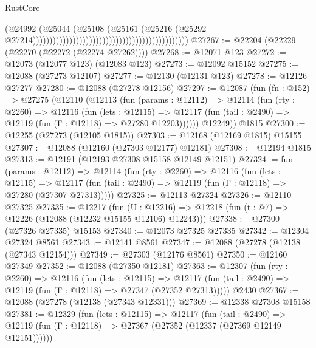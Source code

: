 \begin{lexlean}{RustCore}
\begin{coremodule}
                                                                                      (@24992
                                                                                        (@25044
                                                                                          (@25108
                                                                                            (@25161
                                                                                              (@25216
                                                                                                (@25292
                                                                                                  @27214)))))))))))))))))))))))))))))))))))))))))))))))
@27267 := @22204 (@22229 (@22270 (@22272 (@22274 @27262))))
@27268 := @12071 @123
@27272 := @12073 (@12077 @123) (@12083 @123)
@27273 := @12092 @15152
@27275 := @12088 (@27273 @12107)
@27277 := @12130 (@12131 @123)
@27278 := @12126 @27277
@27280 := @12088 (@27278 @12156)
@27297 := @12087
    (fun (fn : @152) =>
    @27275
      (@12110
        (@12113
          (fun (params : @12112) =>
          @12114
            (fun (rty : @2260) =>
            @12116
              (fun (lets : @12115) =>
              @12117 (fun (tail : @2490) => @12119 (fun (Γ : @12118) => @27280 @12203))))))
        @12249))
    @1815
@27300 := @12255 (@27273 (@12105 @1815))
@27303 := @12168 (@12169 @1815) @15155
@27307 := @12088 (@12160 (@27303 @12177) @12181)
@27308 := @12194 @1815
@27313 := @12191 (@12193 @27308 @15158 @12149 @12151)
@27324 := fun (params : @12112) =>
  @12114
    (fun (rty : @2260) =>
    @12116
      (fun (lets : @12115) =>
      @12117 (fun (tail : @2490) => @12119 (fun (Γ : @12118) => @27280 (@27307 @27313)))))
@27325 := @12113 @27324
@27326 := @12110 @27325
@27335 := @12217
    (fun (U : @12216) => @12218 (fun (t : @7) => @12226 (@12088 (@12232 @15155 @12106) @12243)))
@27338 := @27300 (@27326 @27335) @15153
@27340 := @12073 @27325 @27335
@27342 := @12304 @27324 @8561
@27343 := @12141 @8561
@27347 := @12088 (@27278 (@12138 (@27343 @12154)))
@27349 := @27303 (@12176 @8561)
@27350 := @12160 @27349
@27352 := @12088 (@27350 @12181)
@27363 := @12307
    (fun (rty : @2260) =>
    @12116
      (fun (lets : @12115) =>
      @12117 (fun (tail : @2490) => @12119 (fun (Γ : @12118) => @27347 (@27352 @27313)))))
    @2430
@27367 := @12088 (@27278 (@12138 (@27343 @12331)))
@27369 := @12338 @27308 @15158
@27381 := @12329
    (fun (lets : @12115) =>
    @12117
      (fun (tail : @2490) =>
      @12119 (fun (Γ : @12118) => @27367 (@27352 (@12337 (@27369 @12149 @12151))))))

\end{coremodule}
\end{lexlean}
